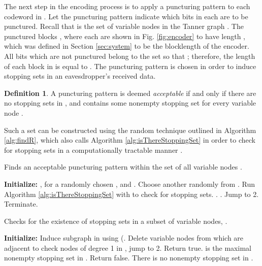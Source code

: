 \documentclass[10pt,twocolumn,twoside]{IEEEtran} \newlength{\pic}
\theoremstyle{definition}
\newtheorem{definition}{Definition}
\theoremstyle{remark}
\theoremstyle{plain}
\begin{document}
The next step in the encoding process is to apply a puncturing pattern to each codeword in . Let the puncturing pattern  indicate which bits in each  are to be punctured. Recall that  is the set of variable nodes in the Tanner graph . The punctured blocks , where each  are shown in Fig. \ref{fig:encoder} to have length , which was defined in Section \ref{sec:system} to be the blocklength of the encoder. All bits which are not punctured belong to the set  so that ; therefore, the length of each block in  is equal to . The puncturing pattern is chosen in order to induce stopping sets in an eavesdropper's received data.
\begin{definition}\label{def:acceptable}
 A puncturing pattern  is deemed \emph{acceptable} if and only if there are no stopping sets in , and  contains some nonempty stopping set  for every variable node .
\end{definition}
Such a set  can be constructed using the random technique outlined in Algorithm \ref{alg:findR}, which also calls Algorithm \ref{alg:isThereStoppingSet} in order to check for stopping sets in a computationally tractable manner \cite{Harrison10_ITW}.

\begin{algorithm}[h]
\caption{Finds an acceptable puncturing pattern  within the set of all variable nodes .}
\begin{algorithmic}[1]
\STATE \textbf{Initialize:} , for a randomly chosen , and .
  \IF{ ()}
    \STATE Choose another  randomly from .
    \STATE Run Algorithm \ref{alg:isThereStoppingSet} with  to check for stopping sets.
      \STATE .
    \ELSE
        \STATE .
    \ENDIF
    \STATE Jump to 2.
  \ELSE
    \STATE Terminate.
  \ENDIF
\end{algorithmic}
\label{alg:findR}
\end{algorithm}

\begin{algorithm}[h]
\caption{Checks for the existence of stopping sets in a subset of variable nodes,  \cite{Harrison10_ITW}.}
\begin{algorithmic}[1]
\STATE \textbf{Initialize:} 
  \IF {  }
    \STATE Induce subgraph  in  using (.
      \STATE Delete variable nodes from  which are adjacent to check nodes of degree 1 in , jump to 2.
    \ELSE
      \STATE Return true.  is the maximal nonempty stopping set in .
    \ENDIF
  \ELSE
    \STATE Return false. There is no nonempty stopping set in .
  \ENDIF
\end{algorithmic}
\label{alg:isThereStoppingSet}
\end{algorithm}
\end{document}

